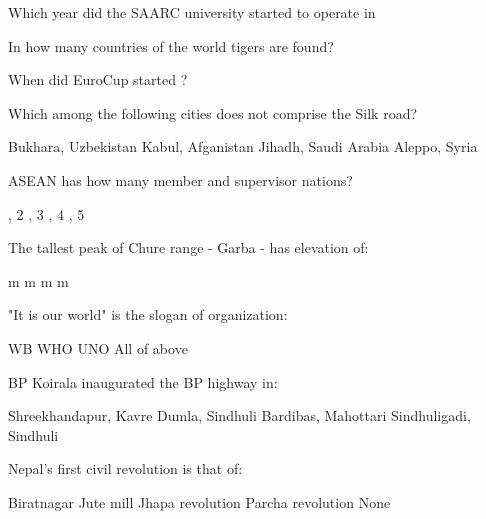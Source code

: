 \begin{questions}
\question Which year did the SAARC university started to operate in
  \begin{choices}
  \end{choices}

\question In how many countries of the world tigers are found?
  \begin{choices}
  \end{choices}

\question When did EuroCup started ?
  \begin{choices}
  \end{choices}

\question Which among the following cities does not comprise the Silk road?
  \begin{choices}
  \choice Bukhara, Uzbekistan
  \choice Kabul, Afganistan
  \CorrectChoice Jihadh, Saudi Arabia
  \choice Aleppo, Syria
  \end{choices}

\question ASEAN has how many member and supervisor nations?
  \begin{choices}
  , 2
  , 3
  , 4
  , 5
  \end{choices}

\question The tallest peak of Chure range - Garba - has elevation of:
  \begin{choices}
   m
   m
   m
   m
  \end{choices}

\question "It is our world" is the slogan of \fillin[][3cm] organization:
  \begin{choices}
  \choice WB
  \choice WHO
  \CorrectChoice UNO
  \choice All of above
  \end{choices}

\question BP Koirala inaugurated the BP highway in:
  \begin{choices}
  \CorrectChoice Shreekhandapur, Kavre
  \choice Dumla, Sindhuli
  \choice Bardibas, Mahottari
  \choice Sindhuligadi, Sindhuli
  \end{choices}

\question Nepal's first civil revolution is that of:
  \begin{choices}
  \CorrectChoice Biratnagar Jute mill
  \choice Jhapa revolution
  \choice Parcha revolution
  \choice None
  \end{choices}


\end{questions}
